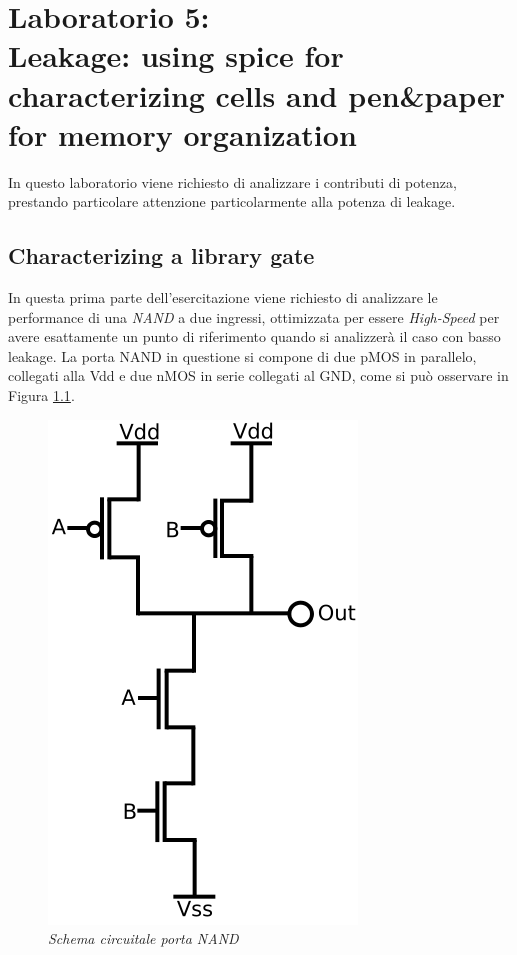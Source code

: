\chapter{Laboratorio 5: \\Leakage: using spice for characterizing cells and pen\&paper for memory organization}
In questo laboratorio viene richiesto di analizzare i contributi di potenza, prestando particolare attenzione particolarmente alla potenza di leakage.

\section{Characterizing a library gate}
In questa prima parte dell'esercitazione viene richiesto di analizzare le performance di una \textit{NAND} a due ingressi, ottimizzata per essere \textit{High-Speed} per avere esattamente un punto di riferimento quando si analizzerà il caso con basso leakage. La porta NAND in questione si compone di due pMOS in parallelo, collegati alla Vdd e due nMOS in serie collegati al GND, come si può osservare in Figura \ref{nand_circuit}. \\
\begin{figure}[!htb]
	\centering
	\includegraphics[scale=0.3]{immagini/nand_circuit}
	\caption{\textit{Schema circuitale porta NAND}}
	\label{nand_circuit}
\end{figure}
